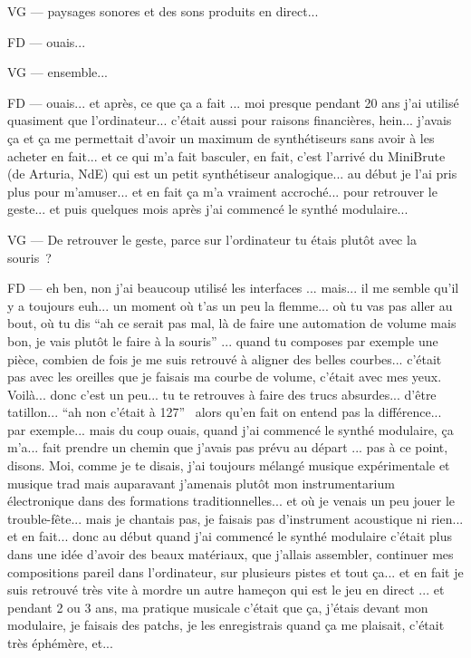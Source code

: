 VG — paysages sonores et des sons produits en direct... 

FD — ouais... 

VG — ensemble... 

FD — ouais... et après, ce que ça a fait ... moi presque pendant 20 ans j'ai utilisé quasiment que l'ordinateur... c'était aussi pour raisons financières, hein... j'avais ça et ça me permettait d'avoir un maximum de synthétiseurs sans avoir à les acheter en fait... et ce qui m'a fait basculer, en fait,  c'est l'arrivé du MiniBrute (de Arturia, NdE) qui est un petit synthétiseur analogique... au début je l'ai pris plus pour m'amuser... et en fait ça m'a vraiment accroché... pour retrouver le geste... et puis quelques mois après j'ai commencé le synthé modulaire... 

VG — De retrouver le geste, parce sur l'ordinateur tu étais plutôt avec la souris ? 

FD — eh ben, non j'ai beaucoup utilisé les interfaces ... mais... il me semble qu'il y a toujours euh... un moment où t'as un peu la flemme... où tu vas pas aller au bout, où tu dis ``ah ce serait pas mal, là de faire une automation de volume mais bon, je vais plutôt le faire à la souris'' ... quand tu composes par exemple une pièce, combien de fois je me suis retrouvé à aligner des belles courbes... c'était pas avec les oreilles que je faisais ma courbe de volume, c'était avec mes yeux. Voilà... donc c'est un peu... tu te retrouves à faire des trucs absurdes... d'être tatillon... ``ah non c'était à 127''  alors qu'en fait on entend pas la différence... par exemple... mais du coup ouais, quand j'ai commencé le synthé modulaire, ça m'a... fait prendre un chemin que j'avais pas prévu au départ ... pas à ce point, disons. Moi, comme je te disais, j'ai toujours mélangé musique expérimentale et musique trad mais auparavant j'amenais plutôt mon instrumentarium électronique dans des formations traditionnelles... et où je venais un peu jouer le trouble-fête... mais je chantais pas, je faisais pas d'instrument acoustique ni rien... et en fait... donc au début quand j'ai commencé le synthé modulaire c'était plus dans une idée d'avoir des beaux matériaux, que j'allais assembler, continuer mes compositions pareil dans l'ordinateur, sur plusieurs pistes et tout ça... et en fait je suis retrouvé très vite à mordre un autre hameçon qui est le jeu en direct ... et pendant 2 ou 3 ans, ma pratique musicale c'était que ça, j'étais devant mon modulaire, je faisais des patchs, je les enregistrais quand ça me plaisait, c'était très éphémère, et... 

